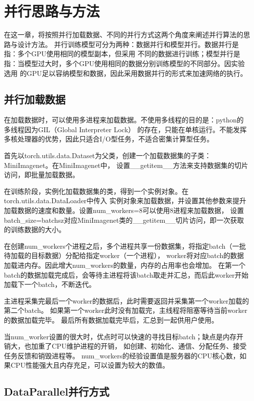 \section{并行思路与方法}

在这一章，将按照并行加载数据、不同的并行方式这两个角度来阐述并行算法的思路与设计方法。
并行训练模型可分为两种：数据并行和模型并行。数据并行是指：多个GPU使用相同的模型副本，但采用
不同的数据进行训练\cite{part}；模型并行是指：当模型过大时，多个GPU使用相同的数据分别训练模型的不同部分。因实验选用
的GPU足以容纳模型和数据，因此采用数据并行的形式来加速网络的执行。

\subsection{并行加载数据}

在加载数据时，可以使用多进程来加载数据。不使用多线程的目的是：python的多线程因为GIL（Global Interpreter Lock）
的存在，只能在单核运行。不能发挥多核处理器的优势，因此只适合I/O型任务，不适合密集计算型任务。

首先以torch.utils.data.Dataset为父类，创建一个加载数据集的子类：MiniImagenet。在MiniImagenet中，
设置\_\_getitem\_\_方法来支持数据集的切片访问，即批量加载数据。

在训练阶段，实例化加载数据集的类，得到一个实例对象。在torch.utils.data.D\-ataLoader中传入
实例对象来加载数据，并设置其他参数来提升加载数据的速度和数量。设置num\_workers=8可以使用8进程来加载数据，
设置batch\_size=batchsz对应MiniImagenet类的\_\_getitem\_\_切片访问，即一次获取的训练数据的大小。

在创建num\_workers个进程之后，多个进程共享一份数据集，将指定batch（一批待加载的目标数据）分配给指定worker（一个进程），
worker将对应batch的数据加载进内存。因此增大num\_workers的数量，内存的占用率也会增加。
在第一个batch的数据加载完成后，会等待主进程将该batch取走并汇总，而后此worker开始加载下一个batch，不断迭代。

主进程采集完最后一个worker的数据后，此时需要返回并采集第一个worker加载的第二个batch。
如果第一个worker此时没有加载完，主线程将阻塞等待当前worker的数据加载完毕。
最后所有数据加载完毕后，汇总到一起供用户使用。

当num\_worker设置的很大时，优点时可以快速的寻找目标batch；缺点是内存开销大，也加重了CPU维护进程的开销，
如创建、初始化、通信、分配任务、接受任务反馈和销毁进程等\cite{process}。
num\_workers的经验设置值是服务器的CPU核心数，如果CPU性能强大且内存充足，可以设置为较大的数值。

\subsection{DataParallel并行方式}


